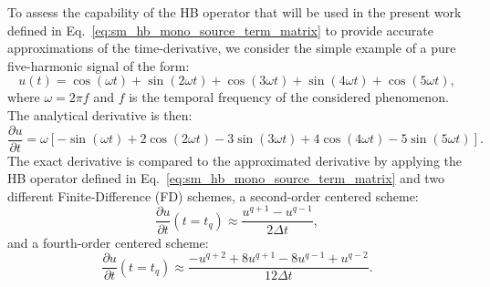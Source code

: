 
To assess the capability of the HB operator that will be used in the present work 
defined in Eq.~\eqref{eq:sm_hb_mono_source_term_matrix} to
provide accurate approximations of the time-derivative, 
we consider the simple example of a pure
five-harmonic signal of the form:
\begin{equation}
    \label{eq:sum_sin}
    u(t) = \cos(\omega t) + \sin(2 \omega t) +
    \cos(3 \omega t) + \sin(4 \omega t) + \cos(5 \omega t),
\end{equation}
where $\omega = 2 \pi f$ and $f$ is the temporal frequency of
the considered phenomenon.
The analytical derivative is then:
\begin{equation}
    \label{eq:sum_sin_deriv}
    \frac{\partial u}{\partial t} = 
    \omega\left[ -\sin(\omega t) + 
    2\cos(2 \omega t) -
    3\sin(3 \omega t) + 
    4\cos(4 \omega t) -
    5\sin(5 \omega t)\right].
\end{equation}
The exact derivative is compared to the approximated derivative by applying 
the HB operator defined in Eq.~\eqref{eq:sm_hb_mono_source_term_matrix}
and two different Finite-Difference (FD) schemes,
a second-order centered scheme:
\begin{equation}
    \frac{\partial u}{\partial t} (t=t_q) \approx 
    \frac{u^{q+1} - u^{q-1}}{2 \Delta t},
    \label{eq:hb_op_center2}
\end{equation}
and a fourth-order centered scheme:
\begin{equation}
    \frac{\partial u}{\partial t} (t=t_q) \approx 
    \frac{-u^{q+2} + 8 u^{q+1} - 8 u^{q-1} + u^{q-2}}{12\Delta t}.
    \label{eq:hb_op_center4}
\end{equation}

